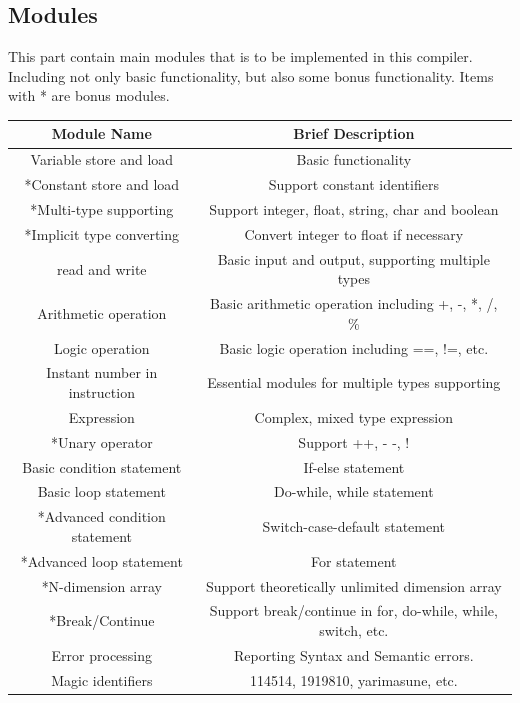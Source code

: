 \documentclass{article}
\begin{document}
		\subsection{Modules}
		This part contain main modules that is to be implemented in this compiler. Including not only basic functionality, but also some bonus functionality. Items with * are bonus modules.
		\begin{center}
		\begin{tabular}{cc}
			\toprule
			Module Name & Brief Description\\
			\midrule
			Variable store and load & Basic functionality\\
			*Constant store and load & Support constant identifiers\\
			*Multi-type supporting & Support integer, float, string, char and boolean\\
			*Implicit type converting & Convert integer to float if necessary \\
			read and write & Basic input and output, supporting multiple types\\
			Arithmetic operation & Basic arithmetic operation including +, -, *, /, \%\\
			Logic operation & Basic logic operation including ==, !=, etc. \\
			Instant number in instruction & Essential modules for multiple types supporting\\
			Expression & Complex, mixed type expression\\
			*Unary operator & Support ++, - -, !\\
			Basic condition statement & If-else statement\\
			Basic loop statement & Do-while, while statement\\
			*Advanced condition statement & Switch-case-default statement\\
			*Advanced loop statement & For statement\\
			*N-dimension array & Support theoretically unlimited dimension array\\
			*Break/Continue & Support break/continue in for, do-while, while, switch, etc.\\
			Error processing & Reporting Syntax and Semantic errors.\\
			Magic identifiers & 114514, 1919810, yarimasune, etc.\\
			\bottomrule 
		\end{tabular}\\
		\end{center}
		
\end{document}
